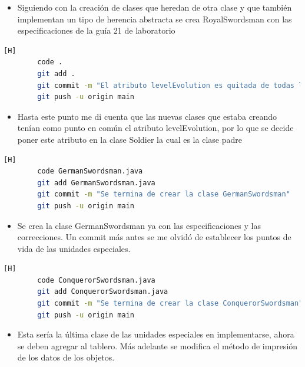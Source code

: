 \documentclass{article}
\begin{document}
	
	\begin{itemize}
		\item Siguiendo con la creación de clases que heredan de otra clase y que también implementan un tipo de herencia abstracta se crea RoyalSwordsman con las especificaciones de la guía 21 de laboratorio
	\end{itemize}
	
	
	
	
	\begin{lstlisting}[language=bash,caption={Commit: 3fcd4f05f464148bacda87a70b2afdeab3f54e6e }][H]
		code .
		git add .
		git commit -m "El atributo levelEvolution es quitada de todas las clases y se pone a la clase Soldier"			
		git push -u origin main
	\end{lstlisting}
	
	
	\begin{itemize}
		\item Hasta este punto me di cuenta que las nuevas clases que estaba creando tenían como punto en común el atributo levelEvolution, por lo que se decide poner este atributo en la clase Soldier la cual es la clase padre 
	\end{itemize}
	
	
	\begin{lstlisting}[language=bash,caption={Commit: 4a8f2a43331921fd43e829c6fb3bd28c43b76541 }][H]
		code GermanSwordsman.java
		git add GermanSwordsman.java
		git commit -m "Se termina de crear la clase GermanSwordsman"			
		git push -u origin main
	\end{lstlisting}
	
	
	\begin{itemize}
		\item Se crea la clase GermanSwordsman ya con las especificaciones y las correcciones. Un commit más antes se me olvidó de establecer los puntos de vida de las unidades especiales.
	\end{itemize}
	
	
	
	
	
	\begin{lstlisting}[language=bash,caption={Commit: b02c4acf5ddd4c26ec86c9d801b0d81d7eb15181 }][H]
		code ConquerorSwordsman.java
		git add ConquerorSwordsman.java
		git commit -m "Se termina de crear la clase ConquerorSwordsman"			
		git push -u origin main
	\end{lstlisting}
	
	
	\begin{itemize}
		\item Esta sería la última clase de las unidades especiales en implementarse, ahora se deben agregar al tablero. Más adelante se modifica el método de impresión de los datos de los objetos.
	\end{itemize}
	
\end{document}

